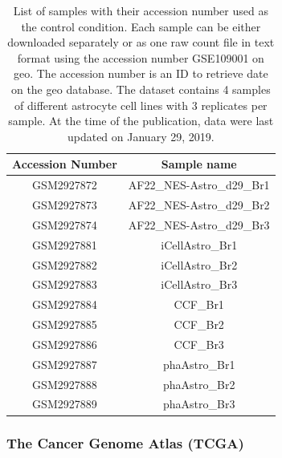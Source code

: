 \begin{table}
    \centering
    \begin{tabular}{ |c|c| }
        \hline
        Accession Number & Sample name \\
        \hline
        GSM2927872 & AF22\_NES-Astro\_d29\_Br1 \\
        GSM2927873 & AF22\_NES-Astro\_d29\_Br2 \\
        GSM2927874 & AF22\_NES-Astro\_d29\_Br3 \\
        \hline
        GSM2927881 & iCellAstro\_Br1 \\
        GSM2927882 & iCellAstro\_Br2 \\
        GSM2927883 & iCellAstro\_Br3 \\
        \hline
        GSM2927884 & CCF\_Br1 \\
        GSM2927885 & CCF\_Br2 \\
        GSM2927886 & CCF\_Br3 \\
        \hline
        GSM2927887 & phaAstro\_Br1 \\ 
        GSM2927888 & phaAstro\_Br2 \\ 
        GSM2927889 & phaAstro\_Br3 \\ 
        \hline
    \end{tabular}
    \caption{
        List of samples with their accession number used as the control condition.
        Each sample can be either downloaded separately or as one raw count file in text format using the accession number GSE109001 on \acrfull{geo}.
        The accession number is an ID to retrieve date on the \acrshort{geo} database.
        The dataset contains 4 samples of different astrocyte cell lines with 3 replicates per sample.
        At the time of the publication, data were last updated on January 29, 2019.
    }
    \label{table:list-control-samples}
\end{table}

\subsubsection{The Cancer Genome Atlas (TCGA) }

